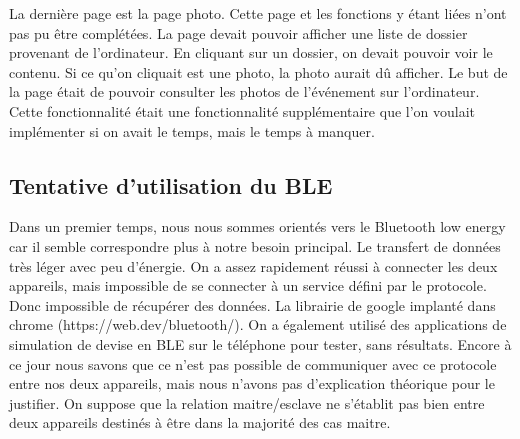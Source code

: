 \documentclass[12pt,fleqn]{article}
\begin{document}
La dernière page est la page photo. Cette page et les fonctions y étant liées n’ont pas pu être complétées. La page devait pouvoir afficher une liste de dossier provenant de l’ordinateur. En cliquant sur un dossier, on devait pouvoir voir le contenu. Si ce qu’on cliquait est une photo, la photo aurait dû afficher. Le but de la page était de pouvoir consulter les photos de l’événement sur l’ordinateur. Cette fonctionnalité était une fonctionnalité supplémentaire que l’on voulait implémenter si on avait le temps, mais le temps à manquer.


\subsection{Tentative d'utilisation du BLE}
Dans un premier temps, nous nous sommes orientés vers le Bluetooth low energy car il semble correspondre plus à notre besoin principal. Le transfert de données très léger avec peu d'énergie. On a assez rapidement réussi à connecter les deux appareils, mais impossible de se connecter à un service défini par le protocole. Donc impossible de récupérer des données. La librairie de google implanté dans chrome (https://web.dev/bluetooth/).
On a également utilisé des applications de simulation de devise en BLE sur le téléphone pour tester, sans résultats. Encore à ce jour nous savons que ce n’est pas possible de communiquer avec ce protocole entre nos deux appareils, mais nous n'avons pas d'explication théorique pour le justifier. On suppose que la relation maitre/esclave ne s'établit pas bien entre deux appareils destinés à être dans la majorité des cas maitre. 
\end{document}
